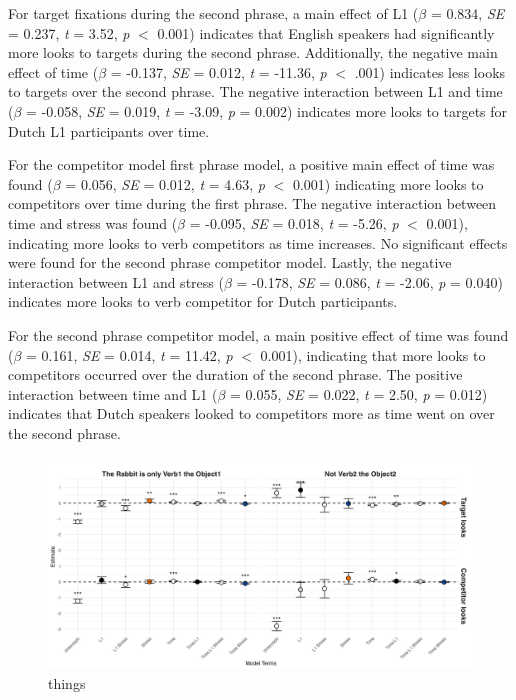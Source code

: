  For target fixations during the second phrase, a main effect of L1 ($\beta$ = 0.834, \textit{SE} = 0.237, \textit{t} = 3.52, \textit{p} $<$ 0.001) indicates that English speakers had significantly more looks to targets during the second phrase. Additionally, the negative main effect of time ($\beta$ = -0.137, \textit{SE} = 0.012, \textit{t} = -11.36, \textit{p} $<$ .001) indicates less looks to targets over the second phrase. The negative interaction between L1 and time ($\beta$ = -0.058, \textit{SE} = 0.019, \textit{t} = -3.09, \textit{p} = 0.002) indicates more looks to targets for Dutch L1 participants over time.

For the competitor model first phrase model, a positive main effect of time was found ($\beta$ = 0.056, \textit{SE} = 0.012, \textit{t} = 4.63, \textit{p} $<$ 0.001) indicating more looks to competitors over time during the first phrase. The negative interaction between time and stress was found ($\beta$ = -0.095, \textit{SE} = 0.018, \textit{t} = -5.26, \textit{p} $<$ 0.001), indicating more looks to verb competitors as time increases. No significant effects were found for the second phrase competitor model. Lastly, the negative interaction between L1 and stress ($\beta$ = -0.178, \textit{SE} = 0.086, \textit{t} = -2.06, \textit{p} = 0.040) indicates more looks to verb competitor for Dutch participants.

For the second phrase competitor model, a main positive effect of time was found ($\beta$ = 0.161, \textit{SE} = 0.014, \textit{t} = 11.42, \textit{p} $<$ 0.001), indicating that more looks to competitors occurred over the duration of the second phrase. The positive interaction between time and L1 ($\beta$ = 0.055, \textit{SE} = 0.022, \textit{t} = 2.50, \textit{p} = 0.012) indicates that Dutch speakers looked to competitors more as time went on over the second phrase. 

\begin{figure}[H]  %
    \centering
    \includegraphics[width=\textwidth,height=\textheight,keepaspectratio]{viz/gam_mod_out.png}
    \caption{things}
    \label{fig:gam_mod_out}
\end{figure}

